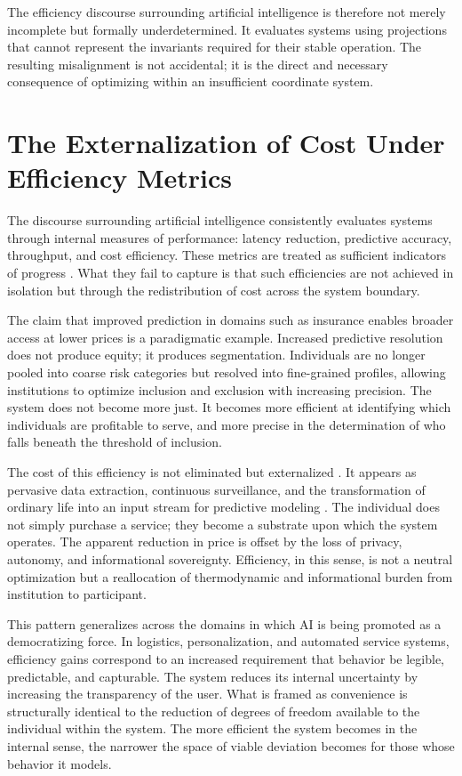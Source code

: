 \documentclass[12pt, a4paper]{article}
\begin{document}
The efficiency discourse surrounding artificial intelligence is therefore not merely incomplete but formally underdetermined. It evaluates systems using projections that cannot represent the invariants required for their stable operation. The resulting misalignment is not accidental; it is the direct and necessary consequence of optimizing within an insufficient coordinate system.

\section{The Externalization of Cost Under Efficiency Metrics}

The discourse surrounding artificial intelligence consistently evaluates systems through internal measures of performance: latency reduction, predictive accuracy, throughput, and cost efficiency. These metrics are treated as sufficient indicators of progress \cite{Goodhart1975}. What they fail to capture is that such efficiencies are not achieved in isolation but through the redistribution of cost across the system boundary.

The claim that improved prediction in domains such as insurance enables broader access at lower prices is a paradigmatic example. Increased predictive resolution does not produce equity; it produces segmentation. Individuals are no longer pooled into coarse risk categories but resolved into fine-grained profiles, allowing institutions to optimize inclusion and exclusion with increasing precision. The system does not become more just. It becomes more efficient at identifying which individuals are profitable to serve, and more precise in the determination of who falls beneath the threshold of inclusion.

The cost of this efficiency is not eliminated but externalized \cite{Prigogine1984}. It appears as pervasive data extraction, continuous surveillance, and the transformation of ordinary life into an input stream for predictive modeling \cite{Zuboff2019}. The individual does not simply purchase a service; they become a substrate upon which the system operates. The apparent reduction in price is offset by the loss of privacy, autonomy, and informational sovereignty. Efficiency, in this sense, is not a neutral optimization but a reallocation of thermodynamic and informational burden from institution to participant.

This pattern generalizes across the domains in which AI is being promoted as a democratizing force. In logistics, personalization, and automated service systems, efficiency gains correspond to an increased requirement that behavior be legible, predictable, and capturable. The system reduces its internal uncertainty by increasing the transparency of the user. What is framed as convenience is structurally identical to the reduction of degrees of freedom available to the individual within the system. The more efficient the system becomes in the internal sense, the narrower the space of viable deviation becomes for those whose behavior it models.
\end{document}
